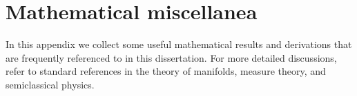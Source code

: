 
\chapter{Mathematical miscellanea}
\label{app:math}

In this appendix we collect some useful mathematical results and derivations that are frequently referenced to in this dissertation.
For more detailed discussions, refer to standard references in the theory of manifolds, measure theory, and semiclassical physics.





